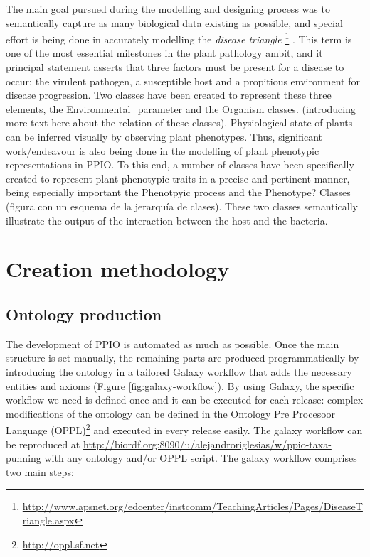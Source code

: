 \documentclass[sw]{iosart2c}
\newcommand{\myurl}[1]{\footnote{\url{#1}}}
\begin{document}
The main goal pursued during the modelling and designing process was to semantically capture as many biological data existing as possible, and special effort is being done in accurately modelling the {\itshape disease triangle} \myurl{http://www.apsnet.org/edcenter/instcomm/TeachingArticles/Pages/DiseaseTriangle.aspx} . This term is one of the most essential milestones in the plant pathology ambit, and it principal statement asserts that three factors must be present for a disease to occur: the virulent pathogen, a susceptible host and a propitious environment for disease progression. Two classes have been created to represent these three elements, the {\sf Environmental\_parameter} and the {\sf Organism} classes. (introducing more text here about the relation of these classes).
Physiological state of plants can be inferred visually by observing plant phenotypes. Thus, significant work/endeavour is also being done in the modelling of plant phenotypic representations in PPIO. To this end, a number of classes have been specifically created to represent plant phenotypic traits in a precise and pertinent manner, being especially important the Phenotpyic process and the Phenotype? Classes (figura con un esquema de la jerarquía de clases). These two classes semantically illustrate the output of the interaction between the host and the bacteria. 


\section{Creation methodology}


\subsection{Ontology production}

The development of PPIO is automated as much as possible. Once the main structure is set manually, the remaining parts are produced programmatically by introducing the ontology in a tailored Galaxy \cite{galaxy} workflow that adds the necessary entities and axioms (Figure \ref{fig:galaxy-workflow}). By using Galaxy, the specific workflow we need is defined once and it can be executed for each release: complex modifications of the ontology can be defined in the Ontology Pre Procesoor Language (OPPL)\myurl{http://oppl.sf.net} and executed in every release easily. The galaxy workflow can be reproduced at \url{http://biordf.org:8090/u/alejandroriglesias/w/ppio-taxa-punning} with any ontology and/or OPPL script. The galaxy workflow comprises two main steps:
\end{document}
